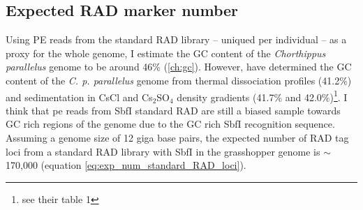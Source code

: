 \documentclass[a4paper,12pt,times,print,index,custombib,custommargin]{PhDThesisPSnPDF}\usepackage[]{graphicx}\usepackage[]{color}
\begin{document}


\FloatBarrier
\subsection{Expected RAD marker number}\label{ch:RAD_marker_number}

Using PE reads from the standard RAD library -- uniqued  per individual -- as a proxy for the whole genome, I estimate the GC content of the \textit{Chorthippus parallelus} genome to be around 46\% (\ref{ch:gc}). However, \cite{Wilmore1975} have determined the GC content of the \textit{C. p. parallelus} genome from thermal dissociation profiles (41.2\%) and sedimentation in CsCl and Cs$_{2}$SO$_{4}$ density gradients (41.7\% and 42.0\%)\footnote{see their table 1}. I think that \gls{pe} reads from SbfI standard RAD are still a biased sample towards GC rich regions of the genome due to the GC rich \gls{SbfI} recognition sequence. 
Assuming a genome size of 12 giga base pairs, the expected number of RAD tag loci from a standard RAD library with \gls{SbfI} in the grasshopper genome is $\sim$170,000 (equation \ref{eq:exp_num_standard_RAD_loci}). 
\end{document}
